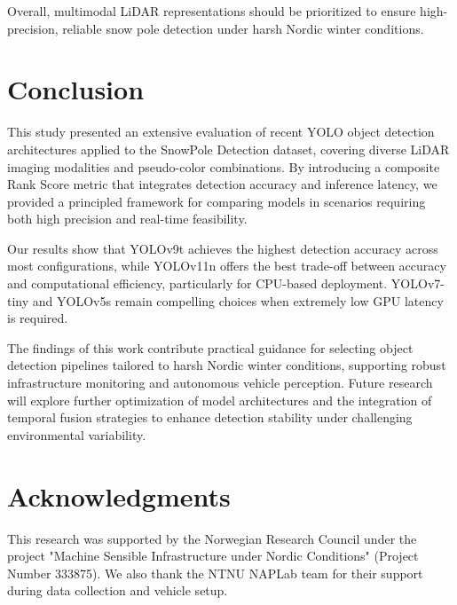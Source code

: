 \documentclass[runningheads]{llncs}
\begin{document}
Overall, multimodal LiDAR representations should be prioritized to ensure high-precision, reliable snow pole detection under harsh Nordic winter conditions.


\section{Conclusion}

This study presented an extensive evaluation of recent YOLO object detection architectures applied to the SnowPole Detection dataset, covering diverse LiDAR imaging modalities and pseudo-color combinations. By introducing a composite Rank Score metric that integrates detection accuracy and inference latency, we provided a principled framework for comparing models in scenarios requiring both high precision and real-time feasibility.

Our results show that YOLOv9t achieves the highest detection accuracy across most configurations, while YOLOv11n offers the best trade-off between accuracy and computational efficiency, particularly for CPU-based deployment. YOLOv7-tiny and YOLOv5s remain compelling choices when extremely low GPU latency is required.

The findings of this work contribute practical guidance for selecting object detection pipelines tailored to harsh Nordic winter conditions, supporting robust infrastructure monitoring and autonomous vehicle perception. Future research will explore further optimization of model architectures and the integration of temporal fusion strategies to enhance detection stability under challenging environmental variability.





\section*{Acknowledgments}
This research was supported by the Norwegian Research Council under the project "Machine Sensible Infrastructure under Nordic Conditions" (Project Number 333875). We also thank the NTNU NAPLab team for their support during data collection and vehicle setup.






\end{document}

